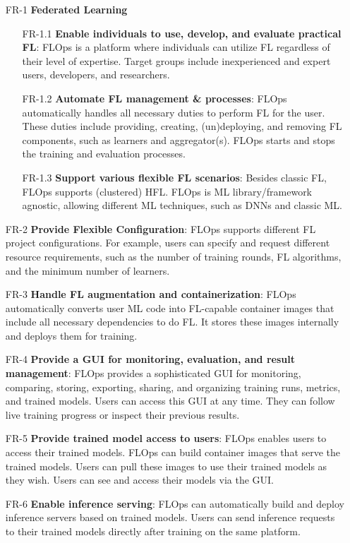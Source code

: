 \begin{itemize}
    \item [FR-1] {\textbf{Federated Learning}}
        \begin{itemize}
        \item [FR-1.1] \textbf{Enable individuals to use, develop, and evaluate practical FL}:
            FLOps is a platform where individuals can utilize FL regardless of their level of expertise.
            Target groups include inexperienced and expert users, developers, and researchers.
        \item [FR-1.2] \textbf{Automate FL management \& processes}:
            FLOps automatically handles all necessary duties to perform FL for the user.
            These duties include providing, creating, (un)deploying, and removing FL components, such as learners and aggregator(s).
            FLOps starts and stops the training and evaluation processes.
        \item [FR-1.3] \textbf{Support various flexible FL scenarios}:
            Besides classic FL, FLOps supports (clustered) HFL.
            FLOps is ML library/framework agnostic, allowing different ML techniques, such as DNNs and classic ML.
        \end{itemize}
    \item [FR-2] {\textbf{Provide Flexible Configuration}}:
        FLOps supports different FL project configurations.
        For example, users can specify and request different resource requirements, such as the number of training rounds, FL algorithms, and the minimum number of learners.
    \item [FR-3] {\textbf{Handle FL augmentation and containerization}}:
        FLOps automatically converts user ML code into FL-capable container images that include all necessary dependencies to do FL.
        It stores these images internally and deploys them for training.
    \item [FR-4] {\textbf{Provide a GUI for monitoring, evaluation, and result management}}:
        FLOps provides a sophisticated GUI for monitoring, comparing, storing, exporting, sharing, and organizing training runs, metrics, and trained models.
        Users can access this GUI at any time.
        They can follow live training progress or inspect their previous results.
    \item [FR-5] {\textbf{Provide trained model access to users}}:
        FLOps enables users to access their trained models.
        FLOps can build container images that serve the trained models.
        Users can pull these images to use their trained models as they wish.
        Users can see and access their models via the GUI.
    \item [FR-6] {\textbf{Enable inference serving}}:
        FLOps can automatically build and deploy inference servers based on trained models.
        Users can send inference requests to their trained models directly after training on the same platform.
\end{itemize}

